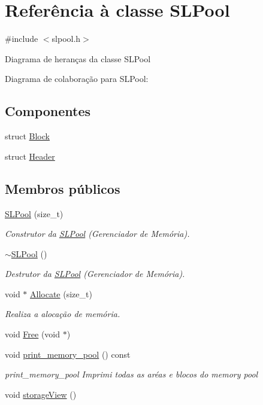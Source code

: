 \hypertarget{classSLPool}{}\section{Referência à classe S\+L\+Pool}
\label{classSLPool}


{\ttfamily \#include $<$slpool.\+h$>$}



Diagrama de heranças da classe S\+L\+Pool


Diagrama de colaboração para S\+L\+Pool\+:
\subsection*{Componentes}
\begin{DoxyCompactItemize}
\item 
struct \hyperlink{structSLPool_1_1Block}{Block}
\item 
struct \hyperlink{structSLPool_1_1Header}{Header}
\end{DoxyCompactItemize}
\subsection*{Membros públicos}
\begin{DoxyCompactItemize}
\item 
\hyperlink{classSLPool_a9e445324d44fff6652cbb70fbd03a5f8}{S\+L\+Pool} (size\+\_\+t)
\begin{DoxyCompactList}\small\item\em Construtor da \hyperlink{classSLPool}{S\+L\+Pool} (Gerenciador de Memória). \end{DoxyCompactList}\item 
\hyperlink{classSLPool_aec8dd0c2fe10addb1786447f8ed62c20}{$\sim$\+S\+L\+Pool} ()
\begin{DoxyCompactList}\small\item\em Destrutor da \hyperlink{classSLPool}{S\+L\+Pool} (Gerenciador de Memória). \end{DoxyCompactList}\item 
void $\ast$ \hyperlink{classSLPool_aaf054ceb8fa1b8e659f656f04a07dc84}{Allocate} (size\+\_\+t)
\begin{DoxyCompactList}\small\item\em Realiza a alocação de memória. \end{DoxyCompactList}\item 
void \hyperlink{classSLPool_aed31c75c4a2d56acd2f845dda2c5b1ad}{Free} (void $\ast$)
\item 
void \hyperlink{classSLPool_a74c29c43b2e158ce4b50bd908e8b5fed}{print\+\_\+memory\+\_\+pool} () const
\begin{DoxyCompactList}\small\item\em print\+\_\+memory\+\_\+pool Imprimi todas as aréas e blocos do memory pool \end{DoxyCompactList}\item 
void \hyperlink{classSLPool_a75d1c2e4e132a3f160842f95105de01d}{storage\+View} ()
\end{DoxyCompactItemize}
